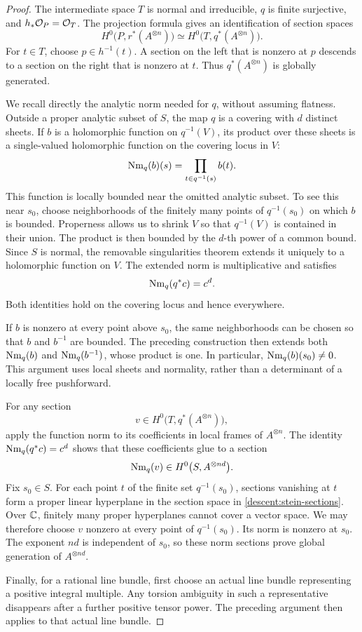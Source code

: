 \begin{proof}
The intermediate space \(T\) is normal and irreducible,
\(q\) is finite surjective, and \(h_*\mathcal O_P=\mathcal O_T\).
The projection formula gives an identification of section spaces
\begin{equation}
\label{descent:stein-sections}
 H^0\bigl(P,r^*(A^{\otimes n})\bigr)
 \simeq
 H^0\bigl(T,q^*(A^{\otimes n})\bigr).
\end{equation}
For \(t\in T\), choose \(p\in h^{-1}(t)\).
A section on the left that is nonzero at \(p\) descends to a
section on the right that is nonzero at \(t\).
Thus \(q^*(A^{\otimes n})\) is globally generated.

We recall directly the analytic norm needed for \(q\), without
assuming flatness.
Outside a proper analytic subset of \(S\), the map \(q\) is a
covering with \(d\) distinct sheets.
If \(b\) is a holomorphic function on \(q^{-1}(V)\), its product
over these sheets is a single-valued holomorphic function on the
covering locus in \(V\):
\[
 \operatorname{Nm}_q(b)(s)=\prod_{t\in q^{-1}(s)} b(t).
\]
This function is locally bounded near the omitted analytic subset.
To see this near \(s_0\), choose neighborhoods of the finitely many
points of \(q^{-1}(s_0)\) on which \(b\) is bounded.
Properness allows us to shrink \(V\) so that \(q^{-1}(V)\) is
contained in their union.
The product is then bounded by the \(d\)-th power of a common
bound.  Since \(S\) is normal, the removable singularities theorem
extends it uniquely to a holomorphic function on \(V\).
The extended norm is multiplicative and satisfies
\[
 \operatorname{Nm}_q(q^*c)=c^d.
\]
Both identities hold on the covering locus and hence everywhere.

If \(b\) is nonzero at every point above \(s_0\), the same
neighborhoods can be chosen so that \(b\) and \(b^{-1}\) are
bounded.  The preceding construction then extends both
\(\operatorname{Nm}_q(b)\) and \(\operatorname{Nm}_q(b^{-1})\), whose product is one.
In particular, \(\operatorname{Nm}_q(b)(s_0)\ne0\).
This argument uses local sheets and normality, rather than a
determinant of a locally free pushforward.

For any section
\[
 v\in H^0\bigl(T,q^*(A^{\otimes n})\bigr),
\]
apply the function norm to its coefficients in local frames of
\(A^{\otimes n}\).
The identity \(\operatorname{Nm}_q(q^*c)=c^d\) shows that these coefficients glue
to a section
\[
 \operatorname{Nm}_q(v)\in H^0\bigl(S,A^{\otimes nd}\bigr).
\]
Fix \(s_0\in S\).
For each point \(t\) of the finite set \(q^{-1}(s_0)\), sections
vanishing at \(t\) form a proper linear hyperplane in the section
space in \eqref{descent:stein-sections}.
Over \(\mathbb C\), finitely many proper hyperplanes cannot cover a
vector space.  We may therefore choose \(v\) nonzero at every
point of \(q^{-1}(s_0)\).
Its norm is nonzero at \(s_0\).
The exponent \(nd\) is independent of \(s_0\), so these norm
sections prove global generation of \(A^{\otimes nd}\).

Finally, for a rational line bundle, first choose an actual line
bundle representing a positive integral multiple.
Any torsion ambiguity in such a representative disappears after
a further positive tensor power.  The preceding argument then
applies to that actual line bundle.
\end{proof}

